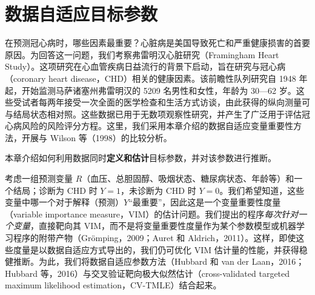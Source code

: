 \chapter{数据自适应目标参数}
\begingroup
\raggedbottom
{}

在预测冠心病时，哪些因素最重要？心脏病是美国导致死亡和严重健康损害的首要原因。为回答这一问题，我们考察弗雷明汉心脏研究（Framingham Heart Study）。这项研究在心血管疾病日益流行的背景下启动，旨在研究与冠心病（coronary heart disease，CHD）相关的健康因素。该前瞻性队列研究自 1948 年起，开始监测马萨诸塞州弗雷明汉的 5209 名男性和女性，年龄为 30—62 岁。这些受试者每两年接受一次全面的医学检查和生活方式访谈，由此获得的纵向测量可与结局状态相对照。这些数据已用于无数项观察性研究，并产生了广泛用于评估冠心病风险的风险评分方程。这里，我们采用本章介绍的数据自适应变量重要性方法，开展与 Wilson 等（1998）的比较分析。

\begin{sourcebox}
本章介绍如何利用数据同时\textbf{定义和估计}目标参数，并对该参数进行推断。
\end{sourcebox}

考虑一组预测变量 $R$（血压、总胆固醇、吸烟状态、糖尿病状态、年龄等）和一个结局；诊断为 CHD 时 $Y=1$，未诊断为 CHD 时 $Y=0$。我们希望知道，这些变量中哪一个对于解释（预测）$Y$“最重要”，因此这是一个变量重要性度量（variable importance measure，VIM）的估计问题。我们提出的程序\emph{每次针对一个变量}，直接靶向其 VIM，而不是将变量重要性度量作为某个参数模型或机器学习程序的附带产物（Grömping，2009；Auret 和 Aldrich，2011）。这样，即使这些度量是以数据自适应方式导出的，我们仍可优化 VIM 估计量的性能，并获得稳健推断。为此，我们将数据自适应参数方法（Hubbard 和 van der Laan，2016；Hubbard 等，2016）与交叉验证靶向极大似然估计（cross-validated targeted maximum likelihood estimation，CV-TMLE）结合起来。

